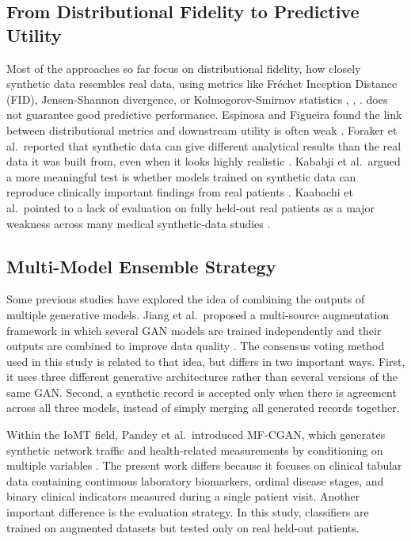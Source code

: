 \subsection{From Distributional Fidelity to Predictive Utility}

Most of the approaches so far focus on distributional fidelity, how closely synthetic data resembles real data, using metrics like Fr\'{e}chet Inception Distance (FID), Jensen-Shannon divergence, or Kolmogorov-Smirnov statistics \cite{yan2022}, \cite{figueira2022}, \cite{dankar2022}.  does not guarantee good predictive performance. Espinosa and Figueira found the link between distributional metrics and downstream utility is often weak \cite{espinosa2023}. Foraker et al.\ reported that synthetic data can give different analytical results than the real data it was built from, even when it looks highly realistic \cite{foraker2020}. Kababji et al.\ argued a more meaningful test is whether models trained on synthetic data can reproduce clinically important findings from real patients \cite{kababji2023}. Kaabachi et al.\ pointed to a lack of evaluation on fully held-out real patients as a major weakness across many medical synthetic-data studies \cite{kaabachi2023}. 

\subsection{Multi-Model Ensemble Strategy}

Some previous studies have explored the idea of combining the outputs of multiple generative models. Jiang et al.\ proposed a multi-source augmentation framework in which several GAN models are trained independently and their outputs are combined to improve data quality \cite{jiang2023}. The consensus voting method used in this study is related to that idea, but differs in two important ways. First, it uses three different generative architectures rather than several versions of the same GAN. Second, a synthetic record is accepted only when there is agreement across all three models, instead of simply merging all generated records together.

Within the IoMT field, Pandey et al.\ introduced MF-CGAN, which generates synthetic network traffic and health-related measurements by conditioning on multiple variables \cite{pandey2025}. The present work differs because it focuses on clinical tabular data containing continuous laboratory biomarkers, ordinal disease stages, and binary clinical indicators measured during a single patient visit. Another important difference is the evaluation strategy. In this study, classifiers are trained on augmented datasets but tested only on real held-out patients. 

